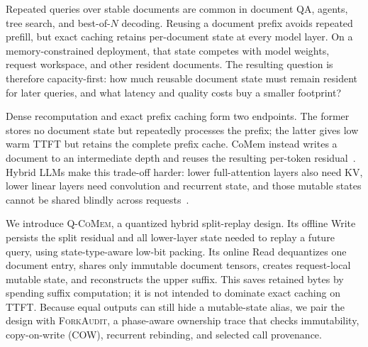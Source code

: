\documentclass{article}
\newcommand{\qcomem}{\textsc{Q-CoMem}}
\newcommand{\method}{\textsc{ForkAudit}}
\begin{document}
Repeated queries over stable documents are common in document QA, agents, tree
search, and best-of-$N$ decoding.  Reusing a document prefix avoids repeated
prefill, but exact caching retains per-document state at every model layer.  On
a memory-constrained deployment, that state competes with model weights,
request workspace, and other resident documents.  The resulting question is
therefore capacity-first: how much reusable document state must remain resident
for later queries, and what latency and quality costs buy a smaller footprint?

Dense recomputation and exact prefix caching form two endpoints.  The former
stores no document state but repeatedly processes the prefix; the latter gives
low warm TTFT but retains the complete prefix cache.  CoMem instead writes a
document to an intermediate depth and reuses the resulting per-token
residual~\citep{liu2026comem,liu2026understanding}.  Hybrid LLMs make this
trade-off harder: lower full-attention layers also need KV, lower linear layers
need convolution and recurrent state, and those mutable states cannot be shared
blindly across requests~\citep{yang2025gateddeltanet,lieber2025jamba}.

We introduce \qcomem{}, a quantized hybrid split-replay design.  Its offline
Write persists the split residual and all lower-layer state needed to replay a
future query, using state-type-aware low-bit packing.  Its online Read
dequantizes one document entry, shares only immutable document tensors, creates
request-local mutable state, and reconstructs the upper suffix.  This saves
retained bytes by spending suffix computation; it is not intended to dominate
exact caching on TTFT.  Because equal outputs can still hide a mutable-state
alias, we pair the design with \method{}, a phase-aware ownership trace that
checks immutability, copy-on-write (COW), recurrent rebinding, and selected call
provenance.
\end{document}
